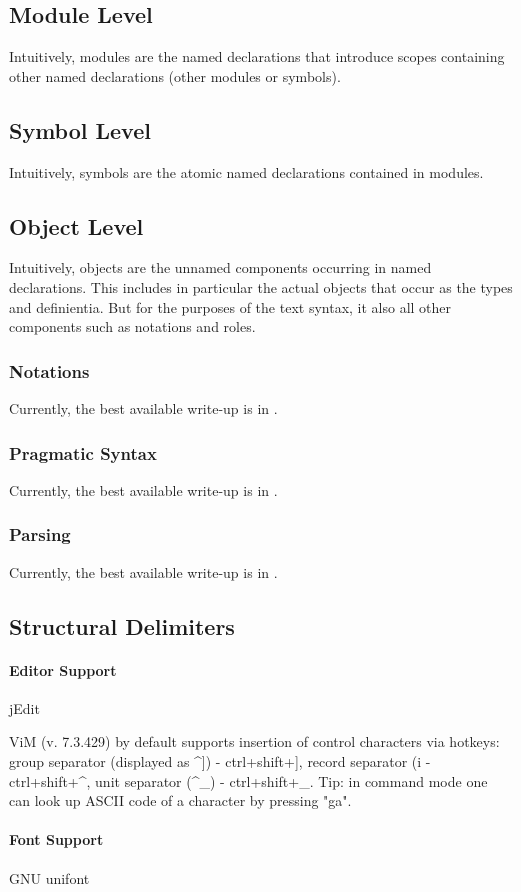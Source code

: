 \subsection{Module Level}

Intuitively, modules are the named declarations that introduce scopes containing other named declarations (other modules or symbols).

\subsection{Symbol Level}

Intuitively, symbols are the atomic named declarations contained in modules.

\subsection{Object Level}

Intuitively, objects are the unnamed components occurring in named declarations.
This includes in particular the actual {\mmt} objects that occur as the types and definientia.
But for the purposes of the text syntax, it also all other components such as notations and roles.

\subsubsection{Notations}

Currently, the best available write-up is in \cite{GIR:mmtlatex:13}.

\subsubsection{Pragmatic Syntax}

Currently, the best available write-up is in \cite{GIR:mmtlatex:13}.

\subsubsection{Parsing}

Currently, the best available write-up is in \cite{GIR:mmtlatex:13}.

\subsection{Structural Delimiters}

\paragraph{Editor Support}

jEdit

ViM (v. 7.3.429) by default supports insertion of control characters via hotkeys: group separator (displayed as ^]) - ctrl+shift+], record separator (^^) - ctrl+shift+^, unit separator (^_) - ctrl+shift+_. Tip: in command mode one can look up ASCII code of a character by pressing "ga".


\paragraph{Font Support}

GNU unifont
